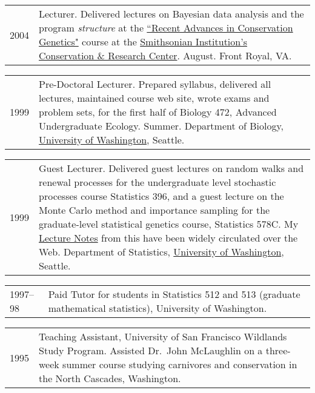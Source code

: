 \documentclass[11pt]{article}
\newlength{\myindent}
\newlength{\postskip}
\newlength{\scndcol}
\begin{document}
\begin{tabular}{ @{}p{2.5\myindent} p{\scndcol}@{}  }
\hspace*{\myindent}2004 &  Lecturer.  Delivered lectures on Bayesian data analysis and the program {\sl structure} at the \href{http://home.ncifcrf.gov/ccr/lgd/geneticscourse/congen_2004/index_2004.asp}{``Recent Advances in Conservation Genetics"} course at the \href{http://nationalzoo.si.edu/ConservationAndScience/CRC/}{Smithsonian Institution's Conservation \& Research Center}.  August.   Front Royal, VA.
\end{tabular}



\begin{tabular}{ @{}p{2.5\myindent} p{\scndcol}@{}  }
\hspace*{\myindent}1999 &  Pre-Doctoral Lecturer. Prepared syllabus, delivered all lectures,
maintained course web site, wrote exams and problem sets,
for the first half of Biology 472, Advanced Undergraduate Ecology.  Summer.  
Department of Biology, \href{http://www.washington.edu/}{University of Washington}, Seattle.
\end{tabular}

\begin{tabular}{ @{}p{2.5\myindent} p{\scndcol}@{}  }

\hspace*{\myindent}1999 & Guest Lecturer. Delivered guest lectures on random walks and renewal
processes for the undergraduate level stochastic processes course Statistics 396, and a guest lecture
on the Monte Carlo method and importance sampling for the graduate-level statistical genetics course,
Statistics 578C.  My \href{http://ib.berkeley.edu/labs/slatkin/eriq/classes/guest_lect/mc_lecture_notes.pdf}{Lecture Notes} from this have been widely circulated over the Web.   Department of Statistics, \href{http://www.washington.edu/}{University of Washington}, Seattle.
\end{tabular}

\begin{tabular}{ @{}p{2.5\myindent} p{\scndcol}@{}  }
\hspace*{\myindent}1997--98 &  Paid Tutor for students in Statistics 512 and 513 (graduate mathematical
statistics), University of Washington.
\end{tabular}

\begin{tabular}{ @{}p{2.5\myindent} p{\scndcol}@{}  }
\hspace*{\myindent}1995 & Teaching Assistant, University of San Francisco Wildlands Study
Program. Assisted Dr.~John McLaughlin on a three-week summer course studying carnivores and conservation
in  the North Cascades, Washington. \\
\end{tabular}
\vspace*{\postskip}
\end{document}
